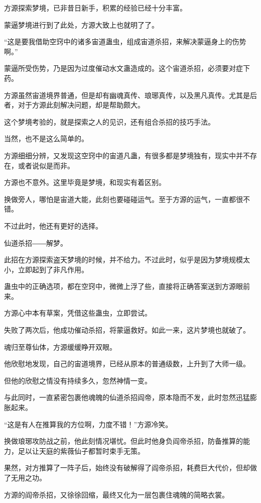 
\begin{this_body}

方源探索梦境，已非昔日新手，积累的经验已经十分丰富。

蒙逼梦境进行到了此处，方源大致上也就明了了。

“这是要我借助空窍中的诸多宙道蛊虫，组成宙道杀招，来解决蒙逼身上的伤势啊。”

蒙逼所受伤势，乃是因为过度催动水文蛊造成的。这个宙道杀招，必须要对症下药。

方源虽然宙道境界普通，但是却有幽魂真传、琅琊真传，以及黑凡真传。尤其是后者，对于方源此刻解决问题，却是帮助颇大。

这个梦境考验的，就是探索之人的见识，还有组合杀招的技巧手法。

当然，也不是这么简单的。

方源细细分辨，又发现这空窍中的宙道凡蛊，有很多都是梦境独有，现实中并不存在，或者说似是而非。

方源也不意外。这里毕竟是梦境，和现实有着区别。

换做旁人，哪怕是宙道大能，此刻也要碰碰运气。至于方源的运气，一直都很不错。

不过此时，他还有更好的选择。

仙道杀招――解梦。

此招在方源探索盗天梦境的时候，并不给力。不过此时，似乎是因为梦境规模太小，立即起到了非凡作用。

蛊虫中的正确选项，都在空窍中，微微上浮了些，直接将正确答案送到方源眼前来。

方源心中本有草案，凭借这些蛊虫，立即尝试。

失败了两次后，他成功催动杀招，将蒙逼救好。如此一来，这片梦境也就破了。

魂归至尊仙体，方源缓缓睁开双眼。

他欣慰地发现，自己的宙道境界，已经从原本的普通级数，上升到了大师一级。

但他的欣慰之情没有持续多久，忽然神情一变。

与此同时，一直紧密包裹他魂魄的仙道杀招阎帝，原本隐而不发，此时忽然迅猛膨胀起来。

“这是有人在推算我的方位啊，力度不错！”方源冷笑。

换做琅琊攻防战之前，他此刻情况堪忧。但此时他身负阎帝杀招，防备推算的能力，足以让天庭的紫薇仙子都暂时束手无策。

果然，对方推算了一阵子后，始终没有破解得了阎帝杀招，耗费巨大代价，但却做了无用之功。

方源的阎帝杀招，又徐徐回缩，最终又化为一层包裹住魂魄的简略衣裳。


\end{this_body}
